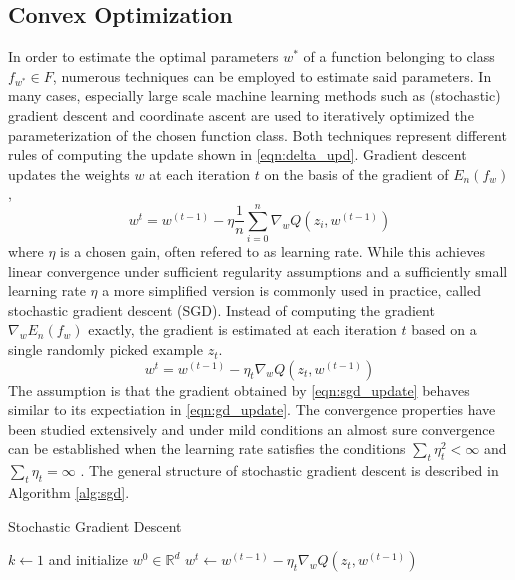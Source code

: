 \subsection{Convex Optimization}
\label{ss:optimization}
In order to estimate the optimal parameters $w^*$ of a function belonging to class $f_{w^*} \in F$, numerous techniques can be employed to estimate said parameters.
In many cases, especially large scale machine learning methods such as (stochastic) gradient descent and coordinate ascent are used to iteratively optimized the parameterization of the chosen function class.
Both techniques represent different rules of computing the update shown in \ref{eqn:delta_upd}.
Gradient descent updates the weights $w$ at each iteration $t$ on the basis of the gradient of $E_n(f_w)$,
\begin{equation}
w^{t} = w^{(t-1)} - \eta\frac{1}{n}\sum_{i=0}^{n}\nabla_wQ(z_i,w^{(t-1)})
\label{eqn:gd_update}
\end{equation}
where $\eta$ is a chosen gain, often refered to as learning rate.
While this achieves linear convergence under sufficient regularity assumptions and a sufficiently small learning rate $\eta$ \cite{dennis1996numerical} \cite{bottou2010large} a more simplified version is commonly used in practice, called stochastic gradient descent (SGD).
Instead of computing the gradient $\nabla_wE_n(f_w)$ exactly, the gradient is estimated at each iteration $t$ based on a single randomly picked example $z_t$.
\begin{equation}
w^{t} = w^{(t-1)} - \eta_t\nabla_wQ(z_t,w^{(t-1)})
\label{eqn:sgd_update}
\end{equation}
The assumption is that the gradient obtained by \ref{eqn:sgd_update} behaves similar to its expectiation in \ref{eqn:gd_update}.
The convergence properties have been studied extensively and under mild conditions an almost sure convergence can be established when the learning rate satisfies the conditions $\sum_t\eta_t^2 < \infty$ and $\sum_t\eta_t = \infty$ \cite{bottou2010large}.
The general structure of stochastic gradient descent is described in Algorithm \ref{alg:sgd}.

\begin{algorithm}
\caption{Stochastic Gradient Descent}\label{alg:sgd}
\begin{algorithmic}[1]
\State $k\gets 1$ and initialize $w^0 \in \mathbb{R}^d$
\Repeat
\For{}
\State $w^{t} \gets w^{(t-1)} - \eta_t\nabla_wQ(z_t,w^{(t-1)})$
\EndFor
{}
\end{algorithmic}
\end{algorithm}

